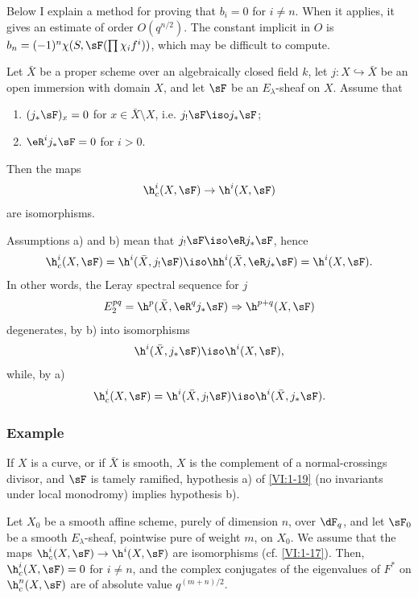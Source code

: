 \documentclass[oneside]{book}
\begin{document}
Below I explain a method for proving that $b_i=0$ for $i\ne n$. 
When it applies, it gives an estimate of order $O(q^{n/2})$. The constant 
implicit in $O$ is $b_n=(-1)^n \chi(S,\sF(\prod \chi_i f^i))$, which may 
be difficult to compute. 





\begin{proposition_}\label{VI:1-19}
Let $\bar X$ be a proper scheme over an algebraically closed field $k$, 
let $j:X\hookrightarrow \bar X$ be an open immersion with domain $X$, and let $\sF$ be an $E_\lambda$-sheaf 
on $X$. Assume that 
\begin{enumerate}[\indent a)]
  \item $(j_\ast\sF)_x = 0$ for $x\in \bar X\setminus X$, i.e. 
    $j_!\sF\iso j_\ast\sF$; 
  \item $\eR^i j_\ast \sF = 0$ for $i>0$.
\end{enumerate}
Then the maps 
\[
  \h_c^i(X,\sF) \to \h^i(X,\sF)
\]
are isomorphisms. 
\end{proposition_}

Assumptions a) and b) mean that $j_! \sF \iso \eR j_\ast \sF$, hence 
\[
  \h_c^i(X,\sF) = \h^i(\bar X,j_!\sF) \iso \hh^i(\bar X,\eR j_\ast \sF) = \h^i(X,\sF) \text{.}
\]
In other words, the Leray spectral sequence for $j$ 
\[
  E_2^{pq} = \h^p(\bar X,\eR^q j_\ast \sF) \Rightarrow \h^{p+q}(X,\sF) 
\]
degenerates, by b) into isomorphisms 
\[
  \h^i(\bar X,j_\ast\sF) \iso \h^i(X,\sF) \text{,}
\]
while, by a) 
\[
  \h_c^i(X,\sF) = \h^i(\bar X,j_!\sF) \iso \h^i(\bar X,j_\ast\sF) \text{.}
\]





\subsubsection{Example}\label{VI:1-19-1}

If $X$ is a curve, or if $\bar X$ is smooth, $X$ is the complement of a 
normal-crossings divisor, and $\sF$ is tamely ramified, 
hypothesis a) of \ref{VI:1-19} (no invariants under local monodromy) 
implies hypothesis b). 





\begin{proposition_}\label{VI:1-20}
Let $X_0$ be a smooth affine scheme, purely of dimension $n$, over $\dF_q$, and let 
$\sF_0$ be a smooth $E_\lambda$-sheaf, pointwise pure of weight $m$, on $X_0$. We 
assume that the maps $\h_c^i(X,\sF) \to \h^i(X,\sF)$ are 
isomorphisms (cf. \ref{VI:1-17}). Then, $\h_c^i(X,\sF) = 0$ for $i\ne n$, and 
the complex conjugates of the eigenvalues of $F^\ast$ on $\h_c^n(X,\sF)$ 
are of absolute value $q^{(m+n)/2}$. 
\end{proposition_}
\end{document}

